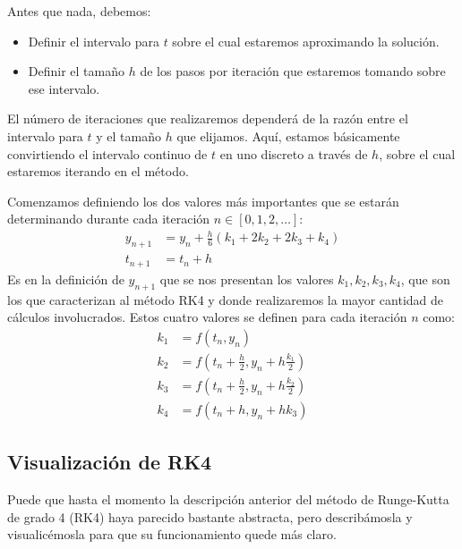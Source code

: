 \documentclass[12pt, a4paper]{article}
\begin{document}
Antes que nada, debemos:
\begin{itemize}
	\item Definir el intervalo para \(t\) sobre el cual estaremos aproximando la solución.
	\item Definir el tamaño \(h\) de los pasos por iteración que estaremos tomando sobre ese intervalo.
\end{itemize}
El número de iteraciones que realizaremos dependerá de la razón entre el intervalo para \(t\) y el tamaño \(h\) que elijamos. Aquí, estamos básicamente convirtiendo el intervalo continuo de \(t\) en uno discreto a través de \(h\), sobre el cual estaremos iterando en el método.

Comenzamos definiendo los dos valores más importantes que se estarán determinando durante cada iteración \(n \in [0, 1, 2, \dots]\):
\begin{align}
	y_{n+1} &= y_{n} + \frac{h}{6} \left( k_{1} + 2k_{2} + 2k_{3} + k_{4} \right) \label{eq:weighted-avg} \\[0.5em]
	t_{n+1} &= t_{n} + h \nonumber
\end{align}
Es en la definición de \(y_{n+1}\) que se nos presentan los valores \(k_{1}, k_{2}, k_{3}, k_{4}\), que son los que caracterizan al método RK4 y donde realizaremos la mayor cantidad de cálculos involucrados. Estos cuatro valores se definen para cada iteración \(n\) como:
\begin{align}
	k_{1} &= f(t_{n}, y_{n}) \label{eq:k1} \\
	k_{2} &= f \left( t_{n} + \frac{h}{2}, y_{n} + h \frac{k_{1}}{2} \right) \label{eq:k2} \\
	k_{3} &= f \left( t_{n} + \frac{h}{2}, y_{n} + h \frac{k_{2}}{2} \right) \label{eq:k3} \\
	k_{4} &= f(t_{n} + h, y_{n} + hk_{3}) \label{eq:k4}
\end{align}

\subsection{Visualización de RK4}

Puede que hasta el momento la descripción anterior del método de Runge-Kutta de grado 4 (RK4) haya parecido bastante abstracta, pero describámosla y visualicémosla para que su funcionamiento quede más claro.
\end{document}

